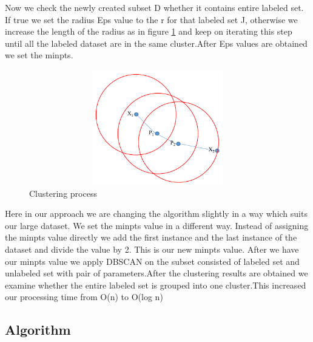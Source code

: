 \documentclass[10pt, conference, compsocconf]{IEEEtran}
\begin{document}
Now we check the newly created subset D whether it contains entire labeled set. If true we set the radius Eps value to the r for that labeled set J, otherwise we increase the length of the radius as in figure \ref{fig:5-Clustering 1} and keep on iterating this step until all the labeled dataset are in the same cluster\cite{adapt}.After Eps values are obtained we set the minpts. 
\begin{figure}[H]
\centering
\includegraphics[width=20cm,height=5cm,keepaspectratio]{weq.png}
\caption{\label{fig:5-Clustering 1} Clustering process}
\end{figure}

Here in our approach we are changing the algorithm slightly in a way which suits our large dataset. We set the minpts value in a different way. Instead of assigning the minpts value directly we add the first instance and the last instance of the dataset and divide the value by 2. This is our new minpts value. After we have our minpts value we apply DBSCAN on the subset consisted of labeled set and unlabeled set with pair of parameters.After the clustering results are obtained we examine whether the entire labeled set is grouped into one cluster.This increased our processing time from O(n) to O(log n)


\subsection{Algorithm}
\end{document}

